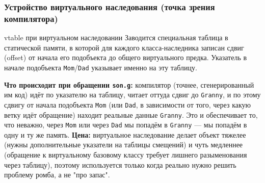 \subsubsection{Устройство виртуального наследования (точка зрения компилятора)}
\begin{definition}{vtable при виртуальном наследовании}{}
Заводится специальная таблица в статической памяти, в которой для каждого класса-наследника записан сдвиг (offset) от начала его подобъекта до общего виртуального предка. Указатель в начале подобъекта \texttt{Mom}/\texttt{Dad} указывает именно на эту таблицу.
\end{definition}
\textbf{Что происходит при обращении \texttt{son.g}:} компилятор (точнее, сгенерированный им код) идёт по указателю на таблицу, читает оттуда сдвиг до \texttt{Granny}, и по этому сдвигу от начала подобъекта \texttt{Mom} (или \texttt{Dad}, в зависимости от того, через какую ветку идёт обращение) находит реальные данные \texttt{Granny}. Это и обеспечивает то, что неважно, через \texttt{Mom} или через \texttt{Dad} мы попадём в \texttt{Granny} --- мы попадём в одну и ту же память.
\textbf{Цена:} виртуальное наследование делает объект тяжелее (нужны дополнительные указатели на таблицы смещений) и чуть медленнее (обращение к виртуальному базовому классу требует лишнего разыменования через таблицу), поэтому используется только когда реально нужно решить проблему ромба, а не "про запас".
